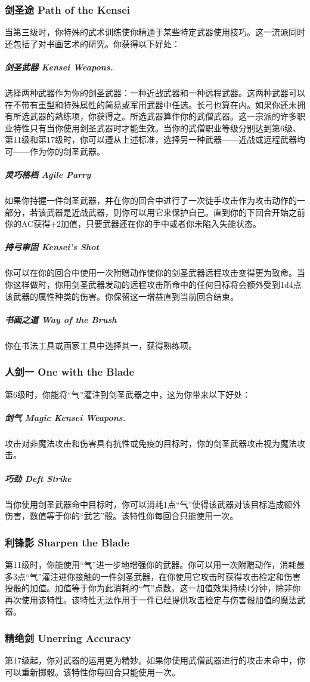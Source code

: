 \subsubsection{剑圣途 Path of the Kensei}当第三级时，你特殊的武术训练使你精通于某些特定武器使用技巧。这一流派同时还包括了对书画艺术的研究。你获得以下好处：
\subparagraph{剑圣武器 Kensei Weapons.}选择两种武器作为你的剑圣武器：一种近战武器和一种远程武器。这两种武器可以在不带有重型和特殊属性的简易或军用武器中任选。长弓也算在内。如果你还未拥有所选武器的熟练项，你获得之。所选武器算作你的武僧武器。这一宗派的许多职业特性只有当你使用剑圣武器时才能生效。当你的武僧职业等级分别达到第6级、第11级和第17级时，你可以遵从上述标准，选择另一种武器——近战或远程武器均可——作为你的剑圣武器。
\subparagraph{灵巧格档 Agile Parry}如果你持握一件剑圣武器，并在你的回合中进行了一次徒手攻击作为攻击动作的一部分，若该武器是近战武器，则你可以用它来保护自己。直到你的下回合开始之前你的AC获得+2加值，只要武器还在你的手中或者你未陷入失能状态。
\subparagraph{持弓审固 Kensei's Shot}你可以在你的回合中使用一次附赠动作使你的剑圣武器远程攻击变得更为致命。当你这样做时，你用剑圣武器发动的远程攻击所命中的任何目标将会额外受到1d4点该武器的属性种类的伤害。你保留这一增益直到当前回合结束。
\subparagraph{书画之道 Way of the Brush}你在书法工具或画家工具中选择其一，获得熟练项。

\subsubsection{人剑一 One with the Blade}第6级时，你能将“气”灌注到剑圣武器之中，这为你带来以下好处：
\subparagraph{剑气 Magic Kensei Weapons.}攻击对非魔法攻击和伤害具有抗性或免疫的目标时，你的剑圣武器攻击视为魔法攻击。
\subparagraph{巧劲 Deft Strike}当你使用剑圣武器命中目标时，你可以消耗1点“气”使得该武器对该目标造成额外伤害，数值等于你的“武艺”骰。该特性你每回合只能使用一次。

\subsubsection{利锋影 Sharpen the Blade}
第11级时，你能使用“气”进一步地增强你的武器。你可以用一次附赠动作，消耗最多3点“气”灌注进你接触的一件剑圣武器，在你使用它攻击时获得攻击检定和伤害投骰的加值。加值等于你为此消耗的“气”点数。这一加值效果持续1分钟，除非你再次使用该特性。该特性无法作用于一件已经提供攻击检定与伤害骰加值的魔法武器。

\subsubsection{精绝剑 Unerring Accuracy}
第17级起，你对武器的运用更为精妙。如果你使用武僧武器进行的攻击未命中，你可以重新掷骰。该特性你每回合只能使用一次。

